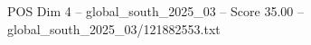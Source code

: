 \begin{textsample}{POS Dim 4 – global\_south\_2025\_03 – Score 35.00 – global\_south\_2025\_03/121882553.txt}
\end{textsample}
